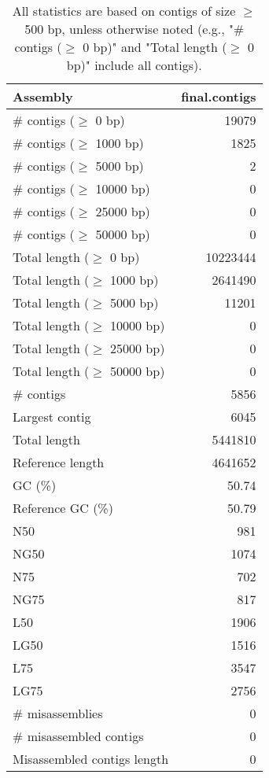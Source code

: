\documentclass[12pt,a4paper]{article}
\begin{document}
\begin{table}[ht]
\begin{center}
\caption{All statistics are based on contigs of size $\geq$ 500 bp, unless otherwise noted (e.g., "\# contigs ($\geq$ 0 bp)" and "Total length ($\geq$ 0 bp)" include all contigs).}
\begin{tabular}{|l*{1}{|r}|}
\hline
Assembly & final.contigs \\ \hline
\# contigs ($\geq$ 0 bp) & 19079 \\ \hline
\# contigs ($\geq$ 1000 bp) & 1825 \\ \hline
\# contigs ($\geq$ 5000 bp) & 2 \\ \hline
\# contigs ($\geq$ 10000 bp) & 0 \\ \hline
\# contigs ($\geq$ 25000 bp) & 0 \\ \hline
\# contigs ($\geq$ 50000 bp) & 0 \\ \hline
Total length ($\geq$ 0 bp) & 10223444 \\ \hline
Total length ($\geq$ 1000 bp) & 2641490 \\ \hline
Total length ($\geq$ 5000 bp) & 11201 \\ \hline
Total length ($\geq$ 10000 bp) & 0 \\ \hline
Total length ($\geq$ 25000 bp) & 0 \\ \hline
Total length ($\geq$ 50000 bp) & 0 \\ \hline
\# contigs & 5856 \\ \hline
Largest contig & 6045 \\ \hline
Total length & 5441810 \\ \hline
Reference length & 4641652 \\ \hline
GC (\%) & 50.74 \\ \hline
Reference GC (\%) & 50.79 \\ \hline
N50 & 981 \\ \hline
NG50 & 1074 \\ \hline
N75 & 702 \\ \hline
NG75 & 817 \\ \hline
L50 & 1906 \\ \hline
LG50 & 1516 \\ \hline
L75 & 3547 \\ \hline
LG75 & 2756 \\ \hline
\# misassemblies & 0 \\ \hline
\# misassembled contigs & 0 \\ \hline
Misassembled contigs length & 0 \\ \hline

\end{tabular}
\end{center}
\end{table}
\end{document}
